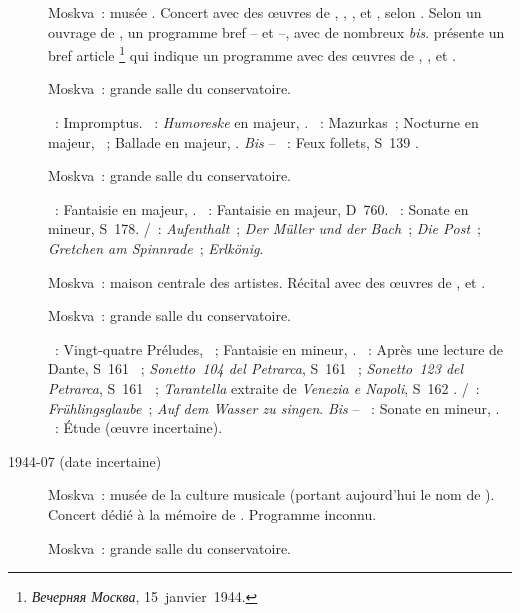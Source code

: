 \begin{description}
 \item[]
 Moskva~: musée \Scriabine{}.
 Concert avec des œuvres de \Beethoven{}, \Schumann{}, \Liszt{},
 \Rachmaninov{} et \Scriabine{}, selon \ASofronitsky{}.
 Selon un ouvrage de \citeauthor{Berkovskaya13}, un programme bref --
 \Scriabine{} et \Chopin{} --, avec de nombreux \emph{bis}.
 \citet{Lazarev20} présente un bref article%
 \footnote{\foreignlanguage{russian}{\emph{Вечерняя Москва}},
 15~janvier~1944.}
 qui indique un programme avec des œuvres de \Beethoven{}, \Schumann{},
 \Liszt{} et \Rachmaninov{}.
 \item[]
 Moskva~: grande salle du conservatoire.

 \textsc{\Schubert{}}~: Impromptus.
 \textsc{\Schumann{}}~: \emph{Humoreske} en \kB \Flat majeur, .
 \textsc{\Chopin{}}~: Mazurkas~; Nocturne en \kE \Flat majeur, 
 ~; Ballade en \kA \Flat majeur, .
 \emph{Bis} -- \textsc{\Liszt{}}~: Feux follets, S~139 .
 \item[]
 Moskva~: grande salle du conservatoire.

 \textsc{\Schumann{}}~: Fantaisie en \kC majeur, .
 \textsc{\Schubert{}}~: Fantaisie  en \kC majeur, D~760.
 \textsc{\Liszt{}}~: Sonate en \kB mineur, S~178.
 \textsc{\Schubert{}/\Liszt{}}~: \emph{Aufenthalt}~; \emph{Der Müller und
 der Bach}~; \emph{Die Post}~; \emph{Gretchen am Spinnrade}~;
 \emph{Erlkönig}.
 \item[]
 Moskva~: maison centrale des artistes.
 Récital avec des œuvres de \Schumann{}, \Liszt{} et \Scriabine{}.
 \item[]
 Moskva~: grande salle du conservatoire.

 \textsc{\Chopin{}}~: Vingt-quatre Préludes, ~; Fantaisie en \kF
 mineur, .
 \textsc{\Liszt{}}~: Après une lecture de Dante, S~161 ~;
 \emph{Sonetto~104 del Petrarca}, S~161 ~; \emph{Sonetto~123 del
 Petrarca}, S~161 ~; \emph{Tarantella} extraite de \emph{Venezia
 e Napoli}, S~162 .
 \textsc{\Schubert{}/\Liszt{}}~: \emph{Frühlingsglaube}~; \emph{Auf dem
 Wasser zu singen}.
 \emph{Bis} -- \textsc{\Beethoven{}}~: Sonate en \kC mineur, .
 \textsc{\Rachmaninov{}}~: Étude (œuvre incertaine).
 \item[1944-07 (date incertaine)]
 Moskva~: musée de la culture musicale (portant aujourd'hui le nom de
 \MGlinka{}).
 Concert dédié à la mémoire de \Scriabine{}.
 Programme inconnu.
 \item[]
 Moskva~: grande salle du conservatoire.


\end{description}
